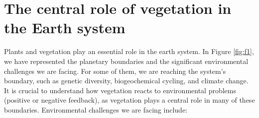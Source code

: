 \documentclass[12pt,oneside]{book}
\begin{document}
\section{The central role of vegetation in the Earth
system}\label{the-central-role-of-vegetation-in-the-earth-system}

Plants and vegetation play an essential role in the earth system. In
Figure \ref{fig:f1}, we have represented the planetary boundaries and
the significant environmental challenges we are facing. For some of
them, we are reaching the system's boundary, such as genetic diversity,
biogeochemical cycling, and climate change. It is crucial to understand
how vegetation reacts to environmental problems (positive or negative
feedback), as vegetation plays a central role in many of these
boundaries. Environmental challenges we are facing include:
\end{document}
